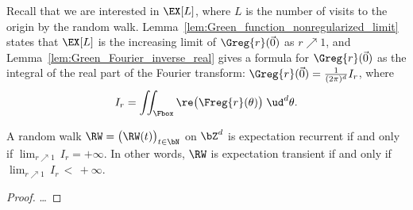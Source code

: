 Recall that we are interested in $\EX[L]$, where $L$ is the number of visits to the
origin by the random walk. Lemma~\ref{lem:Green_function_nonregularized_limit}
states that $\EX[L]$ is the increasing limit of $\Greg{r}(\vec{0})$ as $r \nearrow 1$,
and Lemma~\ref{lem:Green_Fourier_inverse_real} gives a formula for $\Greg{r}(\vec{0})$
as the integral of the real part of the Fourier transform:
$\Greg{r}(\vec{0}) = \frac{1}{(2\pi)^d} I_r$, where
\begin{align}
I_r = \iint_{\Fbox} \re \big( \Freg{r} (\theta) \big) \; \ud^d \theta .
\end{align}

\begin{corollary}
  \label{cor:recurrence_iff_finite_limit_integral}
  A random walk $\RW = \big(\RW(t)\big)_{t \in \bN}$ on $\bZ^d$
  is expectation recurrent if and only if $\lim_{r \nearrow 1} \, I_r = +\infty$.
  In other words, $\RW$ is expectation transient if and only if
  $\lim_{r \nearrow 1} \, I_r \, < \, +\infty$.
\end{corollary}
\begin{proof}
\ldots
\end{proof}



